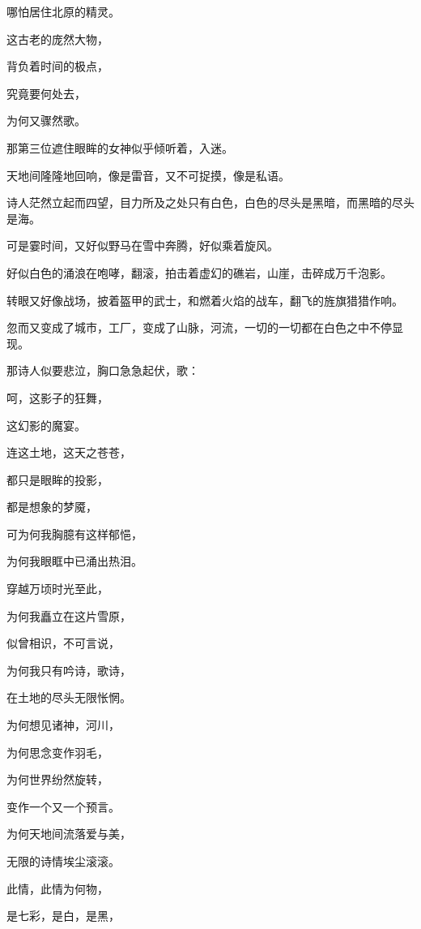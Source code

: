 \documentclass[UTF8]{article}
\begin{document}
\par 哪怕居住北原的精灵。
\par 这古老的庞然大物，
\par 背负着时间的极点，
\par 究竟要何处去，
\par 为何又骤然歌。
\\[0.6cm]
\par 那第三位遮住眼眸的女神似乎倾听着，入迷。
\par 天地间隆隆地回响，像是雷音，又不可捉摸，像是私语。
\\[0.6cm]
\par 诗人茫然立起而四望，目力所及之处只有白色，白色的尽头是黑暗，而黑暗的尽头是海。
\par 可是霎时间，又好似野马在雪中奔腾，好似乘着旋风。
\par 好似白色的涌浪在咆哮，翻滚，拍击着虚幻的礁岩，山崖，击碎成万千泡影。
\par 转眼又好像战场，披着盔甲的武士，和燃着火焰的战车，翻飞的旌旗猎猎作响。
\par 忽而又变成了城市，工厂，变成了山脉，河流，一切的一切都在白色之中不停显现。
\\[0.6cm]
\par 那诗人似要悲泣，胸口急急起伏，歌：
\\[0.6cm]
\par 呵，这影子的狂舞，
\par 这幻影的魔宴。
\par 连这土地，这天之苍苍，
\par 都只是眼眸的投影，
\par 都是想象的梦魇，
\par 可为何我胸臆有这样郁悒，
\par 为何我眼眶中已涌出热泪。
\par 穿越万顷时光至此，
\par 为何我矗立在这片雪原，
\par 似曾相识，不可言说，
\par 为何我只有吟诗，歌诗，
\par 在土地的尽头无限怅惘。
\par 为何想见诸神，河川，
\par 为何思念变作羽毛，
\par 为何世界纷然旋转，
\par 变作一个又一个预言。
\par 为何天地间流落爱与美，
\par 无限的诗情埃尘滚滚。
\par 此情，此情为何物，
\par 是七彩，是白，是黑，
\end{document}
